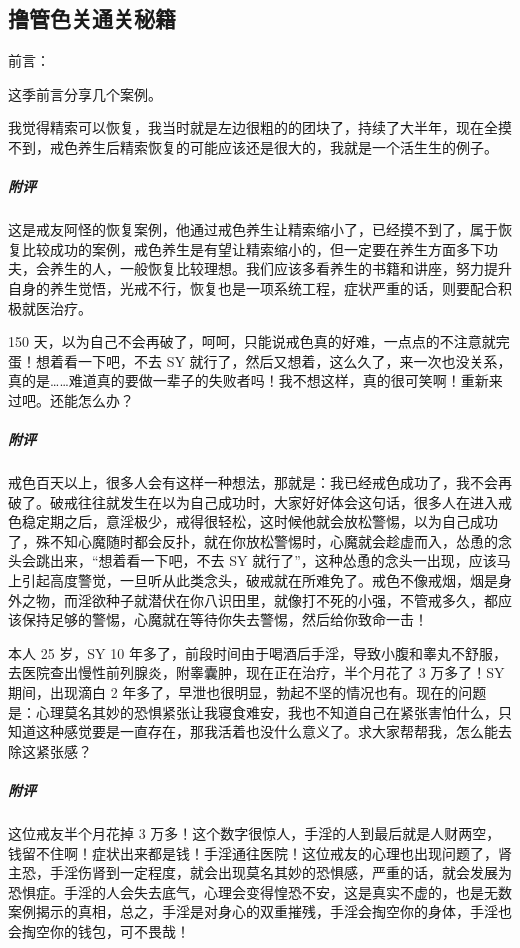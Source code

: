 \subsection{撸管色关通关秘籍}

前言：

这季前言分享几个案例。

\begin{case}
    我觉得精索可以恢复，我当时就是左边很粗的的团块了，持续了大半年，现在全摸不到，戒色养生后精索恢复的可能应该还是很大的，我就是一个活生生的例子。
    \subparagraph{附评} 这是戒友阿怪的恢复案例，他通过戒色养生让精索缩小了，已经摸不到了，属于恢复比较成功的案例，戒色养生是有望让精索缩小的，但一定要在养生方面多下功夫，会养生的人，一般恢复比较理想。我们应该多看养生的书籍和讲座，努力提升自身的养生觉悟，光戒不行，恢复也是一项系统工程，症状严重的话，则要配合积极就医治疗。
\end{case}

\begin{case}
    150 天，以为自己不会再破了，呵呵，只能说戒色真的好难，一点点的不注意就完蛋！想着看一下吧，不去 SY 就行了，然后又想着，这么久了，来一次也没关系，真的是……难道真的要做一辈子的失败者吗！我不想这样，真的很可笑啊！重新来过吧。还能怎么办？
    \subparagraph{附评} 戒色百天以上，很多人会有这样一种想法，那就是：我已经戒色成功了，我不会再破了。破戒往往就发生在以为自己成功时，大家好好体会这句话，很多人在进入戒色稳定期之后，意淫极少，戒得很轻松，这时候他就会放松警惕，以为自己成功了，殊不知心魔随时都会反扑，就在你放松警惕时，心魔就会趁虚而入，怂恿的念头会跳出来，“想着看一下吧，不去 SY 就行了”，这种怂恿的念头一出现，应该马上引起高度警觉，一旦听从此类念头，破戒就在所难免了。戒色不像戒烟，烟是身外之物，而淫欲种子就潜伏在你八识田里，就像打不死的小强，不管戒多久，都应该保持足够的警惕，心魔就在等待你失去警惕，然后给你致命一击！
\end{case}

\begin{case}
    本人 25 岁，SY 10 年多了，前段时间由于喝酒后手淫，导致小腹和睾丸不舒服，去医院查出慢性前列腺炎，附睾囊肿，现在正在治疗，半个月花了 3 万多了！SY 期间，出现滴白 2 年多了，早泄也很明显，勃起不坚的情况也有。现在的问题是：心理莫名其妙的恐惧紧张让我寝食难安，我也不知道自己在紧张害怕什么，只知道这种感觉要是一直存在，那我活着也没什么意义了。求大家帮帮我，怎么能去除这紧张感？
    \subparagraph{附评} 这位戒友半个月花掉 3 万多！这个数字很惊人，手淫的人到最后就是人财两空，钱留不住啊！症状出来都是钱！手淫通往医院！这位戒友的心理也出现问题了，肾主恐，手淫伤肾到一定程度，就会出现莫名其妙的恐惧感，严重的话，就会发展为恐惧症。手淫的人会失去底气，心理会变得惶恐不安，这是真实不虚的，也是无数案例揭示的真相，总之，手淫是对身心的双重摧残，手淫会掏空你的身体，手淫也会掏空你的钱包，可不畏哉！
\end{case}

